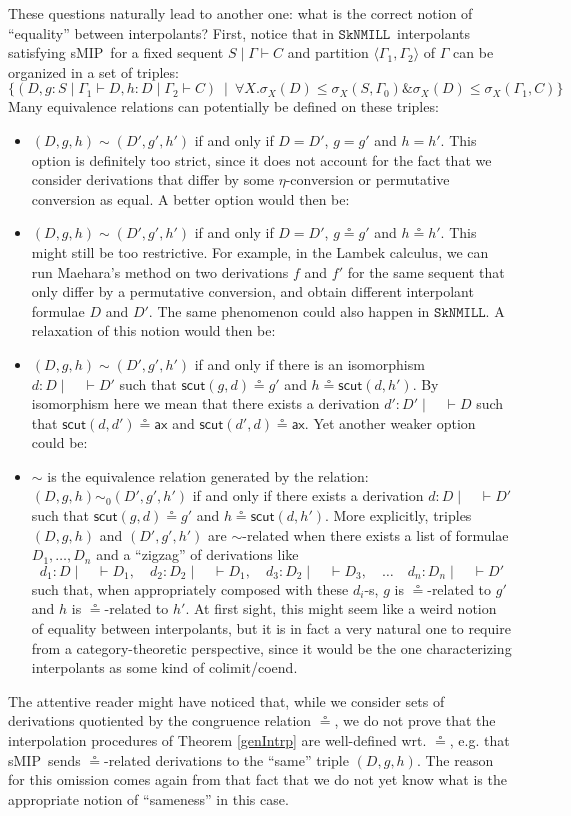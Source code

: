 \documentclass[sn-mathphys-num]{sn-jnl}%
\newcommand{\GG}{\Gamma}
\newcommand{\vd}{\vdash}
\newcommand{\ax}{\mathsf{ax}}
\newcommand{\SkNMILL}{$\mathtt{SkNMILL}$}
\newcommand{\mf}[1]{\mathsf{#1}}
\newcommand{\gs}[1]{\sigma_{X} (#1)}
\newcommand{\scut}[2]{\mf{scut} (#1 , #2)}
\newcommand{\sMIP}{\textsf{sMIP}}
\theoremstyle{thmstyleone}%
\theoremstyle{thmstyletwo}%
\theoremstyle{thmstylethree}%
\begin{document}
These questions naturally lead to another one: what is the correct notion of ``equality'' between interpolants?
First, notice that in \SkNMILL~interpolants satisfying \sMIP~for a fixed sequent $S \mid \GG \vd C$ and partition $\langle \GG_1,\GG_2 \rangle$ of $\GG$ can be organized in a set of triples:
\[
\{
(D, g : S \mid \GG_1 \vd D, h: D \mid \GG_2 \vd C) \ \mid \
\forall X. \gs{D} \leq \gs{S , \GG_0} \& \gs{D} \leq \gs{\GG_1 , C}
\}
\]
Many equivalence relations can potentially be defined on these triples:
\begin{itemize}
\item $(D,g,h) \sim (D',g',h')$ if and only if $D = D'$, $g = g'$ and $h = h'$. This option is definitely too strict, since it does not account for the fact that we consider derivations that differ by some $\eta$-conversion or permutative conversion as equal. A better option would then be:
\item $(D,g,h) \sim (D',g',h')$ if and only if $D = D'$, $g \circeq g'$ and $h \circeq h'$. This might still be too restrictive. For example, in the Lambek calculus, we can run Maehara's method on two derivations $f$ and $f'$ for the same sequent that only differ by a permutative conversion, and obtain different interpolant formulae $D$ and $D'$. The same phenomenon could also happen in \SkNMILL. A relaxation of this notion would then be:
\item $(D,g,h) \sim (D',g',h')$ if and only if there is an isomorphism $d : D \mid \quad \vd D'$ such that $\mf{scut} (g,d) \circeq g'$ and $h \circeq \mf{scut} (d,h')$. By isomorphism here we mean that there exists a derivation $d' : D' \mid \quad \vd D$ such that $\scut{d}{d'} \circeq \ax$ and $\scut{d'}{d} \circeq \ax$. Yet another weaker option could be:
\item $\sim$ is the equivalence relation generated by the relation:
  $(D,g,h) \sim_0 (D',g',h')$ if and only if there exists a derivation $d : D \mid \quad \vd D'$ such that $\mf{scut} (g,d) \circeq g'$ and $h \circeq \mf{scut} (d,h')$. More explicitly, triples $(D,g,h)$ and $(D',g',h')$ are $\sim$-related when there exists a
list of formulae $D_1,\dots,D_n$ and a ``zigzag'' of derivations like
  \[
  d_1 : D \mid \quad \vd D_1,
  \quad
  d_2 : D_2 \mid \quad \vd D_1,
  \quad
  d_3 : D_2 \mid \quad \vd D_3,
  \quad
  \dots
  \quad
  d_n : D_n \mid \quad \vd D'
  \]
  such that, when appropriately composed with these $d_i$-s, $g$ is $\circeq$-related to $g'$ and $h$ is $\circeq$-related to $h'$.
  At first sight, this might seem like a weird notion of equality between interpolants, but it is in fact a very natural one to require from a category-theoretic perspective,  since it would be the one characterizing interpolants as some kind of colimit/coend.
\end{itemize}
The attentive reader might have noticed that, while we consider sets of derivations quotiented by the congruence relation $\circeq$, we do not prove that the interpolation procedures of Theorem \ref{genIntrp} are well-defined wrt. $\circeq$, e.g. that \sMIP~sends $\circeq$-related derivations to the ``same'' triple $(D,g,h)$.
The reason for this omission comes again from that fact that we do not yet know what is the appropriate notion of ``sameness'' in this case.
\end{document}
